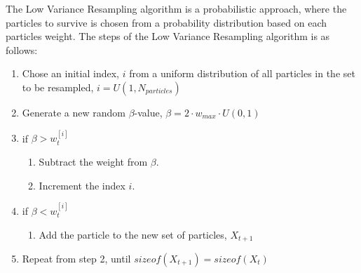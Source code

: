 The Low Variance Resampling algorithm is a probabilistic approach, where the particles to survive is chosen from a probability distribution based on each particles weight.
The steps of the Low Variance Resampling algorithm is as follows:
\begin{enumerate}
    \item Chose an initial index, $i$ from a uniform distribution of all particles in the set to be resampled, $i=U(1,N_{particles})$
    \item Generate a new random $\beta$-value, $\beta = 2 \cdot w_{max} \cdot U(0, 1)$
    \item if $\beta > w_t^{[i]}$
    \begin{enumerate}
        \item Subtract the weight from $\beta$.
        \item Increment the index $i$.
    \end{enumerate}
    \item if $\beta < w_t^{[i]}$
    \begin{enumerate}
        \item Add the particle to the new set of particles, $X_{t+1}$
    \end{enumerate}
    \item Repeat from step 2, until $sizeof \left( X_{t+1} \right) = sizeof \left( X_{t} \right)$
\end{enumerate}















